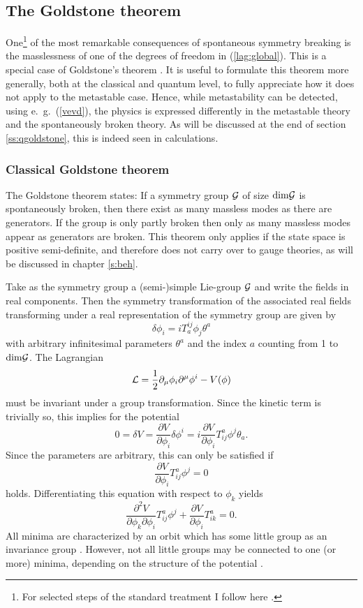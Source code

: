 \documentclass[final,12pt,3p,longtitle]{elsarticle}
\newcommand*{\La}{{\cal{L}}}
\newcommand*{\no}{\noindent}
\newcommand*{\be}{\begin{equation}}
\newcommand*{\ee}{\end{equation}}
\newcommand*{\pd}{\partial}
\newcommand*{\pdm}{\pd_{\mu}}
\newcommand*{\pref}[1]{(\ref{#1})}
\newcommand*{\nn}{\nonumber}
\newcommand*{\1}{1\!\!\!\bot}
\begin{document}
\subsection{The Goldstone theorem}\label{ss:goldstone}

One\footnote{For selected steps of the standard treatment I follow here \cite{Bohm:2001yx}.} of the most remarkable consequences of spontaneous symmetry breaking is the masslessness of one of the degrees of freedom in \pref{lag:global}. This is a special case of Goldstone's theorem \cite{Goldstone:1961eq,Bohm:2001yx,Strocchi:2015uaa}. It is useful to formulate this theorem more generally, both at the classical and quantum level, to fully appreciate how it does not apply to the metastable case. Hence, while metastability can be detected, using e.\ g.\ \pref{vevd}, the physics is expressed differently in the metastable theory and the spontaneously broken theory. As will be discussed at the end of section \ref{ss:qgoldstone}, this is indeed seen in calculations.

\subsubsection{Classical Goldstone theorem}\label{sss:cgoldstone}

The Goldstone theorem \cite{Goldstone:1961eq} states: If a symmetry group ${\cal G}$ of size $\mathrm{dim}{\cal G}$ is spontaneously broken, then there exist as many massless modes as there are generators. If the group is only partly broken then only as many massless modes appear as generators are broken. This theorem only applies if the state space is positive semi-definite, and therefore does not carry over to gauge theories, as will be discussed in chapter \ref{s:beh}.

Take as the symmetry group a (semi-)simple Lie-group ${\cal G}$ and write the fields in real components. Then the symmetry transformation of the associated real fields transforming under a real representation of the symmetry group are given by
\be
\delta\phi_i=iT^{ij}_a\phi_j\theta^a
\ee
\no with arbitrary infinitesimal parameters $\theta^a$ and the index $a$ counting from 1 to $\mathrm{dim}{\cal G}$. The Lagrangian
\be
\La=\frac{1}{2}\pdm\phi_i\pd^\mu\phi^i-V(\phi)\nn
\ee
\no must be invariant under a group transformation. Since the kinetic term is trivially so, this implies for the potential
\be
0=\delta V=\frac{\pd V}{\pd\phi_i}\delta\phi^i=i\frac{\pd V}{\pd\phi_i} T_{ij}^a\phi^j\theta_a\nn.
\ee
\no Since the parameters are arbitrary, this can only be satisfied if
\be
\frac{\pd V}{\pd\phi_i}T_{ij}^a\phi^j=0\nn
\ee
\no holds. Differentiating this equation with respect to $\phi_k$ yields
\be
\frac{\pd^2 V}{\pd\phi_k\pd\phi_i}T_{ij}^a\phi^j+\frac{\pd V}{\pd\phi_i}T_{ik}^a=0\nn.
\ee
\no All minima are characterized by an orbit which has some little group as an invariance group \cite{O'Raifeartaigh:1986vq}. However, not all little groups may be connected to one (or more) minima, depending on the structure of the potential \cite{Li:1973mq,Ruegg:1980gf,Murphy:1983rf}.
\end{document}
